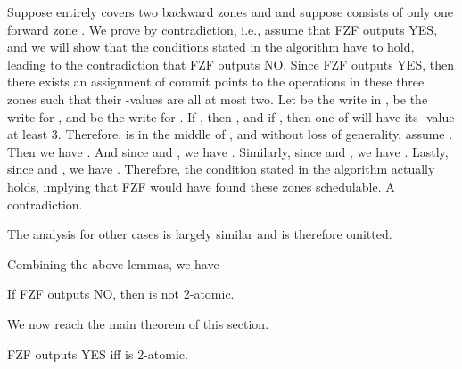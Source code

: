 {Suppose  entirely covers two backward zones  and  and
suppose  consists of only one forward zone .  We prove by
contradiction, i.e., assume that FZF outputs YES, and we will show
that the conditions stated in the algorithm have to hold, leading to
the contradiction that FZF outputs NO.  Since FZF outputs YES, then
there exists an assignment of commit points to the operations in these
three zones such that their -values are all at most two.  Let
 be the write in ,  be the write for , and 
be the write for .  If , then , and if , then one of  will have
its -value at least 3.  Therefore,  is in the middle of
, and without loss of generality, assume .  Then we have .  And since  and , we have .  Similarly, since  and , we have
.  Lastly, since  and , we have .  Therefore, the
condition stated in the algorithm actually holds, implying that FZF
would have found these zones schedulable.  A contradiction.

The analysis for other cases is largely similar and is therefore
omitted.  \QED

Combining the above lemmas, we have

\begin{lemma}
  \label{lemma:???}
  If FZF outputs NO, then  is not 2-atomic.
\end{lemma}

We now reach the main theorem of this section.

\begin{theorem}
  \label{thm:???}
  FZF outputs YES iff  is 2-atomic.
\end{theorem}
}

